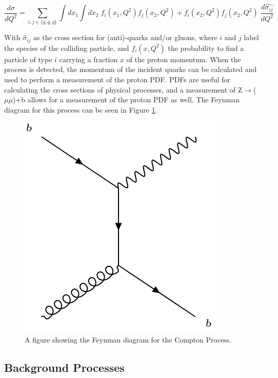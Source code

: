 \documentclass[12pt,a4paper,epsf,portrait,times,epsfig]{report}
\begin{document}
		\begin{center}
			\begin{equation}
			\frac{d\sigma}{dQ^{2}}=\sum_{i,j\in \{q,\overline{q},g\}}\int dx_{1}\int dx_{2}\; f_{i}(x_{1},Q^{2})f_{j}(x_{2},Q^{2})+f_{i}(x_{2},Q^{2})f_{j}(x_{2},Q^{2})\;\frac{d\hat{\sigma_{ij}}}{dQ^{2}}
			\end{equation}
		\end{center}
		
		With $\hat{\sigma}_{ij}$ as the cross section for (anti)-quarks and/or gluons, where $i$ and $j$ label the species of the colliding particle, and $f_{i}(x,Q^{2})$ the probability to find a particle of type $i$ carrying a fraction $x$ of the proton momentum\cite{Article:PartonDistributions}. When the process is detected, the momentum of the incident quarks can be calculated and used to perform a measurement of the proton PDF. PDFs are useful for calculating the cross sections of physical processes, and a measurement of Z$\rightarrow$($\mu\mu$)+b allows for a measurement of the proton PDF as well. The Feynman diagram for this process can be seen in Figure \ref{Fig:ZbbCompton}.
		
		\begin{figure}[h!]
			\centering
			\includegraphics[scale=0.5]{Zbb_3.png}
			\caption{A figure showing the Feynman diagram for the Compton Process.}
			\label{Fig:ZbbCompton} 
		\end{figure}
			
		\subsection{Background Processes}
	
\end{document}
